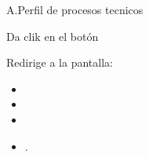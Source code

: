 

	\begin{UCtrayectoriaA}{A.}{Perfil de procesos tecnicos}

		\UCpaso[\UCactor] Da clik en el botón 

		\UCpaso Redirige a la pantalla:
			\begin{itemize}
				\item	{} 
				\item	{}
				\item 	{}
				\item 	{}.
			\end{itemize}

	\end{UCtrayectoriaA}	


